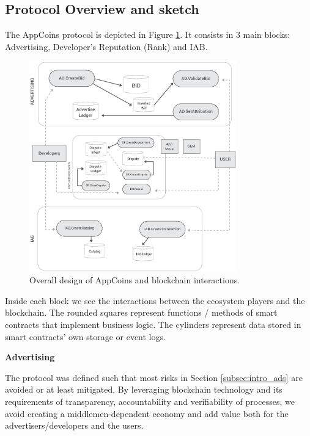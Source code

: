 \subsection{Protocol Overview and sketch}


The AppCoins protocol is depicted in Figure \ref{fig:design}. It consists in 3 main blocks: Advertising, 
Developer's Reputation (Rank) and IAB.

\begin{figure}[!ht]
\centering
\includegraphics[width=0.8\textwidth]{diagrams/design.eps}
\caption{Overall design of AppCoins and blockchain interactions.}
\label{fig:design}
\end{figure}

Inside each block we see the interactions between the ecosystem players and the blockchain. The 
rounded squares represent functions / methods of smart contracts that implement business logic. The 
cylinders represent data stored in smart contracts' own storage or event logs. \\

\medskip

{\bf Advertising}

The protocol was defined such that most risks in Section \ref{subsec:intro_ads} are avoided or at least mitigated. By leveraging blockchain technology and its requirements of transparency, accountability and verifiability of processes, we avoid creating a middlemen-dependent economy and add value both for the advertisers/developers and the users. \\

